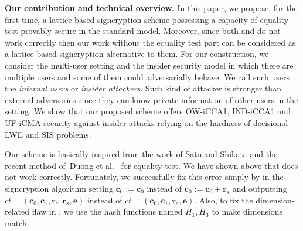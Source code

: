 \documentclass[a4paper,11pt,onecolumn]{elsarticle}
\begin{document}
		
	
	\noindent \textbf{Our contribution and technical overview.} In this paper, we propose, for the first time, a lattice-based signcryption scheme possessing a capacity of equality test provably secure in the standard model.  Moreover, since both \cite{LWJ+14} and \cite{SS18} do not work correctly then our work without the equality test part can be considered as a  lattice-based signcryption alternative to them.  For our construction, we consider the multi-user setting and  the insider security model in which there are multiple users and some of them could adversarially behave. We call such users the \textit{internal users} or \textit{insider attackers}. Such kind of attacker is stronger than external adversaries since they can know private information of other users in the setting. We show that our proposed scheme offers OW-iCCA1, IND-iCCA1 and UF-iCMA security against insider attacks relying on the hardness of decisional-LWE and SIS problems. 
	
 Our scheme is basically inspired from the work of Sato and Shikata \cite{SS18} and the recent method of~Duong et al.~\cite{Duongetal2019} for equality test.  We have shown above that \cite{SS18} does not work correctly.  Fortunately, we successfully fix this error simply by in the signcryption algorithm setting $\textbf{c}_0:=\overline{\textbf{c}}_0$ instead of $\textbf{c}_0:=\overline{\textbf{c}}_0+\textbf{r}_s$ and outputting $ct=(\textbf{c}_0, \textbf{c}_1, \textbf{r}_e, \textbf{r}_s, \textbf{e})$ instead of $ct=(\textbf{c}_0, \textbf{c}_1, \textbf{r}_e,  \textbf{e})$. Also, to fix the dimension-related flaw in \cite{SS18}, we use the hash functions named $H_1, H_3$ to make dimensions match.  
	
	 
\end{document}
